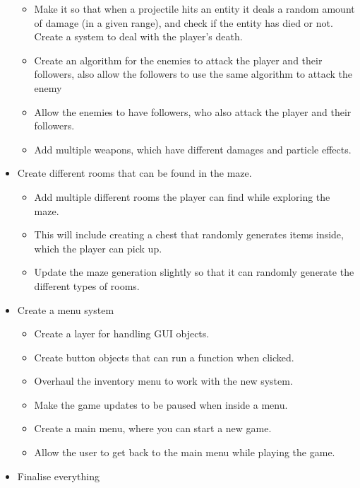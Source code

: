 \documentclass[../Main.tex]{subfiles}
\begin{document}
\begin{itemize}
\begin{itemize}
                    \item Make it so that when a projectile hits an entity it deals a random amount of damage (in a given range), and check if the entity has died or not. Create a system to deal with the player's death.
                    \item Create an algorithm for the enemies to attack the player and their followers, also allow the followers to use the same algorithm to attack the enemy
                    \item Allow the enemies to have followers, who also attack the player and their followers.
                    \item Add multiple weapons, which have different damages and particle effects.
                \end{itemize}
            \item Create different rooms that can be found in the maze.
                \begin{itemize}
                    \item Add multiple different rooms the player can find while exploring the maze.
                    \item This will include creating a chest that randomly generates items inside, which the player can pick up.
                    \item Update the maze generation slightly so that it can randomly generate the different types of rooms.
                \end{itemize}
            \item Create a menu system
                \begin{itemize}
                    \item Create a layer for handling GUI objects.
                    \item Create button objects that can run a function when clicked.
                    \item Overhaul the inventory menu to work with the new system.
                    \item Make the game updates to be paused when inside a menu.
                    \item Create a main menu, where you can start a new game.
                    \item Allow the user to get back to the main menu while playing the game.
                \end{itemize}
            \item Finalise everything
                \begin{itemize}

\end{itemize}
\end{itemize}
\end{document}

